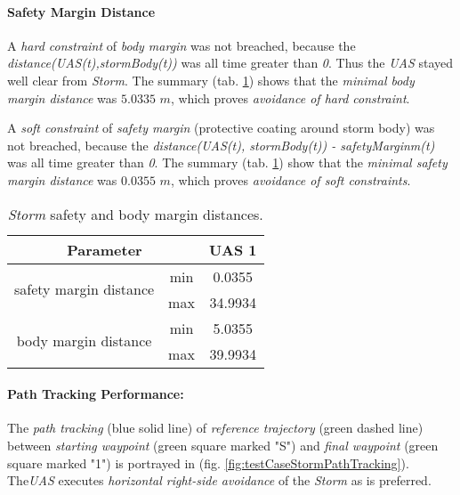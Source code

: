     
    \paragraph{Safety Margin Distance} A \emph{hard constraint} of \emph{body margin} was not breached, because the \emph{distance(UAS(t),stormBody(t))} was all time greater than \emph{0}. Thus the \emph{UAS} stayed well clear from \emph{Storm}. The summary (tab. \ref{tab:testCaseStormSafetyAndBodyMarginDistances}) shows that the \emph{minimal body margin distance} was $5.0335$ $m$, which proves \emph{avoidance of hard constraint}.
    
    A \emph{soft constraint} of \emph{safety margin} (protective coating around storm body) was not breached, because the \emph{distance(UAS(t), stormBody(t)) - safetyMarginm(t)} was all time greater than \emph{0}.  The summary (tab. \ref{tab:testCaseStormSafetyAndBodyMarginDistances}) show that the \emph{minimal safety margin distance} was $0.0355$ $m$, which proves \emph{avoidance of soft constraints}.
    
    \begin{table}[H]
        \centering
        \begin{tabular}{c|c||c}
        \multicolumn{2}{c||}{Parameter} & UAS 1 \\\hline\hline
        \multirow{2}{*}{safety margin distance} & min & 0.0355 \\\cline{2-3}
                                                & max & 34.9934 \\\hline
        \multirow{2}{*}{body margin distance}   & min & 5.0355 \\\cline{2-3}
                                                & max & 39.9934 
        \end{tabular}
        \caption{\emph{Storm} safety and body margin distances.}
        \label{tab:testCaseStormSafetyAndBodyMarginDistances}
    \end{table}
    
    \paragraph{Path Tracking Performance:} The \emph{path tracking} (blue solid line) of \emph{reference trajectory} (green dashed line) between \emph{starting waypoint} (green square marked "S") and \emph{final waypoint} (green square marked "1") is portrayed in (fig. \ref{fig:testCaseStormPathTracking}). The\emph{UAS} executes \emph{horizontal right-side avoidance} of the \emph{Storm} as is preferred. 
    
